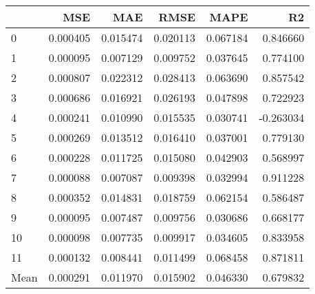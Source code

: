 \begin{tabular}{lrrrrr}
\toprule
 & MSE & MAE & RMSE & MAPE & R2 \\
\midrule
0 & 0.000405 & 0.015474 & 0.020113 & 0.067184 & 0.846660 \\
1 & 0.000095 & 0.007129 & 0.009752 & 0.037645 & 0.774100 \\
2 & 0.000807 & 0.022312 & 0.028413 & 0.063690 & 0.857542 \\
3 & 0.000686 & 0.016921 & 0.026193 & 0.047898 & 0.722923 \\
4 & 0.000241 & 0.010990 & 0.015535 & 0.030741 & -0.263034 \\
5 & 0.000269 & 0.013512 & 0.016410 & 0.037001 & 0.779130 \\
6 & 0.000228 & 0.011725 & 0.015080 & 0.042903 & 0.568997 \\
7 & 0.000088 & 0.007087 & 0.009398 & 0.032994 & 0.911228 \\
8 & 0.000352 & 0.014831 & 0.018759 & 0.062154 & 0.586487 \\
9 & 0.000095 & 0.007487 & 0.009756 & 0.030686 & 0.668177 \\
10 & 0.000098 & 0.007735 & 0.009917 & 0.034605 & 0.833958 \\
11 & 0.000132 & 0.008441 & 0.011499 & 0.068458 & 0.871811 \\
Mean & 0.000291 & 0.011970 & 0.015902 & 0.046330 & 0.679832 \\
\bottomrule
\end{tabular}
